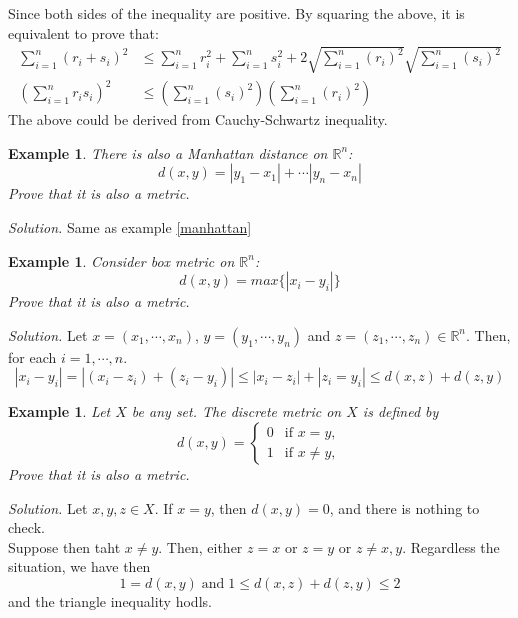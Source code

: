 \documentclass[12pt,a4paper]{article}
\theoremstyle{plain}
\newtheorem{example}[theorem]{Example}
\begin{document}
Since both sides of the inequality are positive. By squaring the above, it is equivalent to prove that:
\begin{equation}
    \begin{split}
    \sum^n_{i=1}(r_i+s_i)^2 &\leq \sum^n_{i=1}r_i^2 + \sum^n_{i=1}s_i^2 + 2\sqrt{\sum^n_{i=1}(r_i)^2}\sqrt{\sum^n_{i=1}(s_i)^2} \\
    (\sum^n_{i=1}r_is_i)^2 &\leq (\sum^n_{i=1}(s_i)^2)(\sum^n_{i=1}(r_i)^2)
    \end{split}
\end{equation}
The above could be derived from Cauchy-Schwartz inequality. 

\begin{example}
    There is also a Manhattan distance on $\mathbb{R}^n$:
    \begin{equation}
        d(x,y)=|y_1-x_1|+\cdots|y_n-x_n|
    \end{equation}
    Prove that it is also a metric. 
\end{example}
\noindent\emph{Solution.}
Same as example \ref{manhattan}

\begin{example}
    Consider box metric on $\mathbb{R}^n$:
    \begin{equation}
        d(x,y)=max\{|x_i-y_i|\}
    \end{equation}
    Prove that it is also a metric. 
\end{example}
\noindent\emph{Solution.}
Let $x=(x_1,\cdots,x_n)$, $y=(y_1,\cdots,y_n)$ and $z=(z_1,\cdots,z_n) \in \mathbb{R}^n$. Then, for each $i=1,\cdots,n$.
\begin{equation}
    |x_i-y_i| = |(x_i-z_i)+(z_i-y_i)| \leq |x_i-z_i| + |z_i=y_i| \leq d(x,z) + d(z,y)
\end{equation} 

\begin{example}
    Let $X$ be any set. The discrete metric on $X$ is defined by 
    \begin{equation}
        d(x,y)=
    \begin{cases}
    0&\text{if $x=y$},\\
    1&\text{if $x\neq y$},
    \end{cases}
    \end{equation}
    Prove that it is also a metric. 
\end{example}
\noindent\emph{Solution.}
Let $x,y,z\in X$. If $x=y$, then $d(x,y)=0$, and there is nothing to check. \\
Suppose then taht $x\neq y$. Then, either $z=x$ or $z=y$ or $z\neq x,y$. Regardless the situation, we have then
\begin{equation}
    1=d(x,y) \; \text{and} \; 1 \leq d(x,z) + d(z,y) \leq 2
\end{equation}
and the triangle inequality hodls. 
\end{document}
